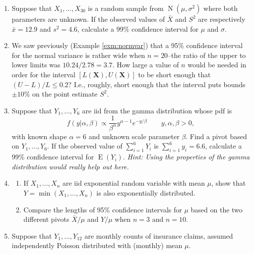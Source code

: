 \documentclass[
]{book}
\newcommand{\bX}{{\boldsymbol X}}
\DeclareMathOperator{\E}{E}
\DeclareMathOperator{\N}{N}
\theoremstyle{definition}
\theoremstyle{definition}
\theoremstyle{definition}
\theoremstyle{definition}
\theoremstyle{remark}
\begin{document}
\begin{enumerate}
  \begin{enumerate}
  \def\labelenumii{(\alph{enumii})}
  \item
    \(H_0:\theta=\theta_0\) v.s. \(H_1:\theta \neq \theta_0\).
  \item
    \(H_0:\theta\geq\theta_0\) v.s. \(H_1:\theta < \theta_0\).
  \end{enumerate}

  (c)\(H_0:\theta\leq\theta_0\) v.s. \(H_1:\theta > \theta_0\).
\item
  Suppose that \(X_1,\dots,X_{30}\) is a random sample from \(\N(\mu,\sigma^2)\) where both parameters are unknown. If the observed values of \(\bar X\) and \(S^2\) are respectively \(\bar x = 12.9\) and \(s^2=4.6\), calculate a 99\% confidence interval for \(\mu\) and \(\sigma\).
\item
  We saw previously (Example \ref{exm:normvar}) that a 95\% confidence interval for the normal variance is rather wide when \(n=20\)--the ratio of the upper to lower limits was \(10.24/2.78=3.7\). How large a value of \(n\) would be needed in order for the interval \([L(\bX),U(\bX)]\) to be short enough that \((U-L)/L\leq 0.2\)? I.e., roughly, short enough that the interval puts bounds \(\pm 10\)\% on the point estimate \(S^2\).
\item
  Suppose that \(Y_1,\dots,Y_{6}\) are iid from the gamma distribution whose pdf is
  \[
    f(y|\alpha,\beta)\propto \frac{1}{\beta^\alpha}y^{\alpha-1}e^{-y/\beta} \hspace{2em}y,\alpha,\beta>0,
    \]
  with known shape \(\alpha=6\) and unknown scale parameter \(\beta\). Find a pivot based on \(Y_1,\dots,Y_6\). If the observed value of \(\sum_{i=1}^6 Y_i\) is \(\sum_{i=1}^6 y_i=6.6\), calculate a 99\% confidence interval for \(\E(Y_i)\). \emph{Hint: Using the properties of the gamma distribution would really help out here.}
\item
  \begin{enumerate}
  \def\labelenumii{(\alph{enumii})}
  \item
    If \(X_1,\dots,X_n\) are iid exponential random variable with mean \(\mu\), show that \(Y = \min(X_1,\dots,X_n)\) is also exponentially distributed.
  \item
    Compare the lengths of 95\% confidence intervals for \(\mu\) based on the two different pivots \(\bar X/\mu\) and \(Y/\mu\) when \(n=3\) and \(n=10\).
  \end{enumerate}
\item
  Suppose that \(Y_1,\dots,Y_{12}\) are monthly counts of insurance claims, assumed independently Poisson distributed with (monthly) mean \(\mu\).


\end{enumerate}
\end{document}
